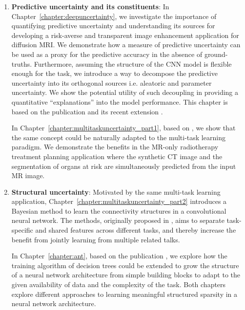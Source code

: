 \begin{enumerate}[label=(\alph*)]
	\item \textbf{Predictive uncertainty and its constituents}: In Chapter~\ref{chapter:deepuncertainty}, we investigate the importance of quantifying predictive uncertainty and understanding its sources for developing a risk-averse and transparent image enhancement application for diffusion MRI. We demonstrate how a measure of predictive uncertainty can be used as a proxy for the predictive accuracy in the absence of ground-truths. Furthermore, assuming the structure of the CNN model is flexible enough for the task, we introduce a way to decompose the predictive uncertainty into its orthogonal sources i.e. aleatoric and parameter uncertainty. We show the potential utility of such decoupling in providing a quantitative ``explanations'' into the model performance. This chapter is based on the publication  \cite{tanno2017bayesian} and its recent extension \cite{tannonimg2019}. 
	
	In Chapter~\ref{chapter:multitaskuncertainty_part1}, based on \cite{bragman2018multi}, we show that the same concept could be naturally adapted to the multi-task learning paradigm. We demonstrate the benefits in the MR-only radiotherapy treatment planning application where the synthetic CT image and the segmentation of organs at risk are simultaneously predicted from the input MR image. 
	
	\item \textbf{Structural uncertainty}: 	Motivated by the same multi-task learning application, Chapter~\ref{chapter:multitaskuncertainty_part2} introduces a Bayesian method to learn the connectivity structures in a convolutional neural network. The methods, originally proposed in \cite{sfg2019},  aims to separate task-specific and shared features across different tasks, and thereby increase the benefit from jointly learning from multiple related talks. 
	
	In Chapter~\ref{chapter:ant}, based on the publication \cite{AdaptiveNeuralTrees19}, we explore how the training algorithm of decision trees could be extended to grow the structure of a neural network architecture from simple building blocks to adapt to the given availability of data and the complexity of the task. Both chapters explore different approaches to learning meaningful structured sparsity in a neural network architecture. 
	

\end{enumerate}
